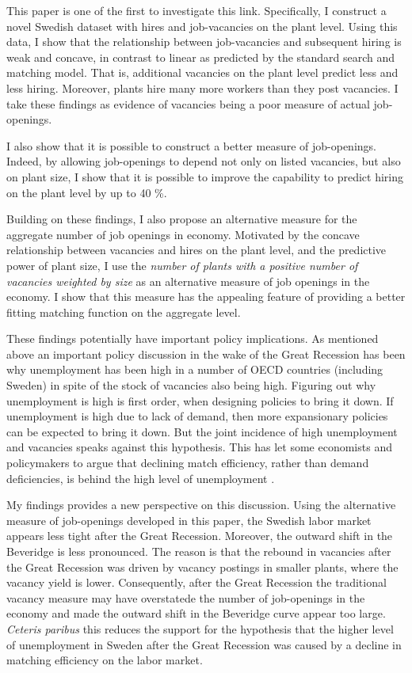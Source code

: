 This paper is one of the first to investigate this link. Specifically, I construct a novel Swedish dataset with hires and job-vacancies on the plant level. Using this data, I show that the relationship between job-vacancies and subsequent hiring is weak and concave, in contrast to linear as predicted by the standard search and matching model. That is, additional vacancies on the plant level predict less and less hiring. Moreover, plants hire many more workers than they post vacancies. I take these findings as evidence of vacancies being a poor measure of actual job-openings. 

I also show that it is possible to construct a better measure of job-openings. Indeed, by allowing job-openings to depend not only on listed vacancies, but also on plant size, I show that it is possible to improve the capability to predict hiring on the plant level by up to 40 \%. 

Building on these findings, I also propose an alternative measure for the aggregate number of job openings in economy. Motivated by the concave relationship between vacancies and hires on the plant level, and the predictive power of plant size, I use the \emph{number of plants with a positive number of vacancies weighted by size} as an alternative measure of job openings in the economy. I show that this measure has the appealing feature of providing a better fitting matching function on the aggregate level. 

These findings potentially have  important policy implications. As mentioned above an important policy discussion in the wake of the Great Recession has been why unemployment has been high in a number of OECD countries (including Sweden) in spite of the stock of vacancies also being high. Figuring out why unemployment is high is first order, when designing policies to bring it down. If unemployment is high due to lack of demand, then more expansionary policies can be expected to bring it down. But the joint incidence of high unemployment and vacancies speaks against this hypothesis. This has let some economists and policymakers to argue that declining match efficiency, rather than demand deficiencies, is behind the high level of unemployment \citep{Hall2015, Riksbank2012}.

My findings provides a new perspective on this discussion. Using the alternative measure of job-openings developed in this paper, the Swedish labor market appears less tight after the Great Recession. Moreover, the outward shift in the Beveridge is less pronounced. The reason is that the rebound in vacancies after the Great Recession was driven by vacancy postings in smaller plants, where the vacancy yield is lower. Consequently, after the Great Recession the traditional vacancy measure may have overstatede the number of job-openings in the economy and made the outward shift in the Beveridge curve appear too large. \emph{Ceteris paribus} this reduces the support for the hypothesis that the higher level of unemployment in Sweden after the Great Recession was caused by a decline in matching efficiency on the labor market.

